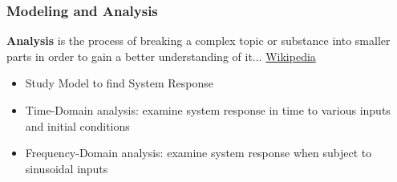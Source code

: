\documentclass[fleqn]{beamer} %
\newcommand{\sectionIsubsectionIItitle}{Modeling and Analysis}
\begin{document}
			\begin{frame}
				\frametitle{\sectionIsubsectionIItitle}
				\bigskip

				{\bf Analysis} is the process of breaking a complex topic or substance into smaller parts in order to gain a better understanding of it... \href{https://en.wikipedia.org/wiki/Analysis}{\tiny Wikipedia}

				\begin{itemize}
					\item Study Model to find System Response
					\item Time-Domain analysis: examine system response in time to various inputs and initial conditions
					\item Frequency-Domain analysis: examine system response when subject to sinusoidal inputs
				\end{itemize}
		
				\btVFill
			\end{frame}

\end{document}
